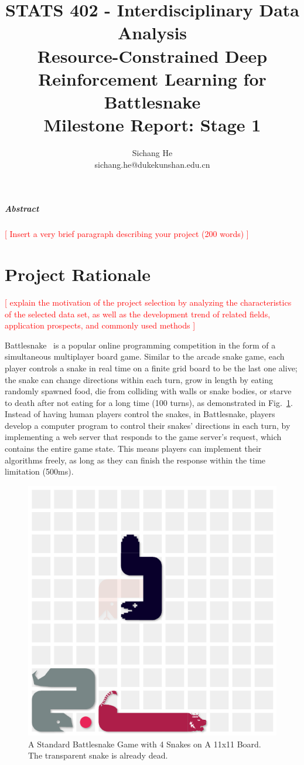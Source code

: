 \documentclass[a4paper]{article}
\title{STATS 402 - Interdisciplinary Data Analysis\\
    Resource-Constrained Deep Reinforcement Learning for Battlesnake\\
    Milestone Report: Stage 1
}
\author{Sichang He\\
    sichang.he@dukekunshan.edu.cn
}
\newcommand{\todo}[1]{\textcolor{red}{[ #1 ]}}
\begin{document}
\maketitle

\subparagraph{Abstract}

\todo{Insert a very brief paragraph describing your project (200 words)}

\section{Project Rationale}

\todo{explain the motivation of the project
    selection by analyzing the characteristics of the selected data set,
    as well as the development trend of related fields, application prospects,
    and commonly used methods}

Battlesnake~\cite{battlesnake}
is a popular online programming competition in the form of a simultaneous
multiplayer board game. Similar to the arcade snake game,
each player controls a snake in real time on a finite grid board to be the last
one alive; the snake can change directions within each turn,
grow in length by eating randomly spawned food,
die from colliding with walls or snake bodies,
or starve to death after not eating for a long time (100 turns),
as demonstrated in Fig.~\ref{fig:game}.
Instead of having human players control the snakes, in Battlesnake,
players develop a computer program to control their snakes' directions in each
turn, by implementing a web server that responds to the game server's request,
which contains the entire game state.
This means players can implement their algorithms freely,
as long as they can finish the response within the time limitation (500ms).

\begin{figure}
    \centering
    \includegraphics[width=0.4\linewidth]{snake_game_screenshot.png}
    \caption{A Standard Battlesnake Game with 4 Snakes on A 11x11 Board.
        The transparent snake is already dead.
    }
    \label{fig:game}
\end{figure}
\end{document}
